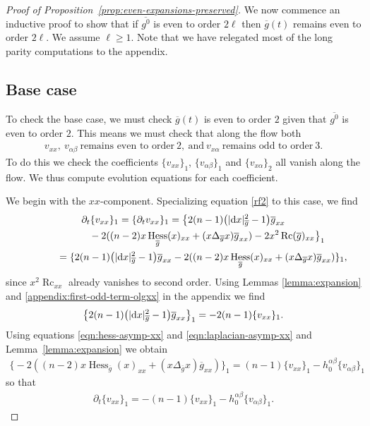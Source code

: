 \documentclass[pdftex]{sigma}
\numberwithin{equation}{section}
\newcommand{\del}{\partial}
\newcommand{\olg}{\overline{g}}
\newcommand{\olgin}{\overline{\gin}}
\newcommand{\gin}{{g^0}}
\newcommand{\gbar}{\overline{g}}
\DeclareMathOperator{\Rc}{Rc}
\DeclareMathOperator{\hess}{Hess}
\begin{document}
\begin{proof}[Proof of Proposition~\ref{prop:even-expansions-preserved}]
We now commence an inductive proof to show that if $\olgin$ is even to order $2\ell$ then $\olg(t)$ remains even to order $2\ell$. We assume $\ell \geq 1$. Note that we have relegated most of the long parity computations to the appendix.

\subsection*{Base case}
To check the base case, we must check $\olg(t)$ is even to order $2$ given that $\olgin$ is even to order $2$. This means we must check that along the flow both
\begin{align*}
v_{xx}, \ v_{\alpha \beta}\ \mbox{remains even to order} \ 2, \ \mbox{and} \ v_{x\alpha} \ \mbox{remains odd to order} \ 3.
\end{align*}
To do this we check the coefficients $\{v_{xx}\}_1$, $\{v_{\alpha \beta}\}_1$ and $\{v_{x\alpha}\}_2$ all vanish along the flow. We thus compute evolution equations for each coefficient.

We begin with the $xx$-component. Specializing equation \eqref{rf2} to this case, we find
\begin{gather*}
\del_t \{ v_{xx} \}_{1} = \{ \del_t v_{xx}\}_{1}
 =\big\{ 2 (n-1) \big(|{\rm d}x|^2_{\gbar} -1\big) \olg_{xx} \\
 \hphantom{\del_t \{ v_{xx} \}_{1} =}{} -2 ( (n-2) x \hess_{\olg} (x)_{xx} + (x \Delta_{\olg} x) \olg_{xx} ) -2 x^2 \Rc(\gbar)_{xx}\big\}_1 \\
 \hphantom{\del_t \{ v_{xx} \}_{1}}{} =\{ 2 (n-1) \big(|{\rm d}x|^2_{\gbar} -1\big) \olg_{xx} -2 ( (n-2) x \hess_{\olg} (x)_{xx} + (x \Delta_{\olg} x) \olg_{xx} )\}_1,
\end{gather*}
since $x^2 \Rc_{xx}$ already vanishes to second order. Using Lemmas \ref{lemma:expansion} and \ref{appendix:first-odd-term-olgxx} in the appendix we find
\begin{gather*}
\big\{ 2 (n-1) \big(|{\rm d}x|^2_{\gbar} -1\big) \olg_{xx}\big\}_{1} = - 2(n-1) \{v_{xx}\}_1.
\end{gather*}
Using equations \eqref{eqn:hess-asymp-xx} and \eqref{eqn:laplacian-asymp-xx} and Lemma~\ref{lemma:expansion} we obtain
\begin{gather*}
\big\{{-}2 ( (n-2) x \hess_{\olg} (x)_{xx} + (x \Delta_{\olg} x) \olg_{xx} )\big\}_1 = (n-1) \{v_{xx}\}_1 - h_0^{\alpha \beta} \{v_{\alpha \beta}\}_{1}
\end{gather*}
so that
\begin{gather*}
\del_t \{ v_{xx} \}_{1} = -(n-1) \{v_{xx}\}_1 - h_0^{\alpha \beta} \{v_{\alpha \beta}\}_{1}.
\end{gather*}


\end{proof}
\end{document}
